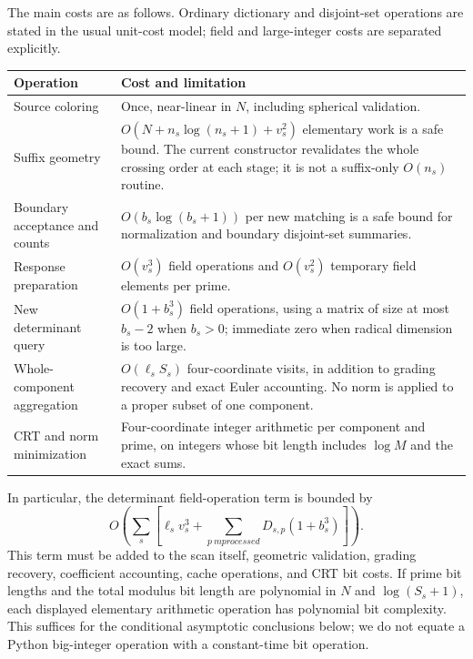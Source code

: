 The main costs are as follows. Ordinary dictionary and disjoint-set operations
are stated in the usual unit-cost model; field and large-integer costs are
separated explicitly.

\begin{center}
\begin{tabularx}{\textwidth}{@{}P{0.29\textwidth}X@{}}
\toprule
Operation & Cost and limitation\\
\midrule
Source coloring & Once, near-linear in $N$, including spherical validation.\\
Suffix geometry & $O(N+n_s\log(n_s+1)+v_s^2)$ elementary work is a safe bound.
The current constructor revalidates the whole crossing order at each stage;
it is not a suffix-only $O(n_s)$ routine.\\
Boundary acceptance and counts & $O(b_s\log(b_s+1))$ per new matching is a safe
bound for normalization and boundary disjoint-set summaries.\\
Response preparation & $O(v_s^3)$ field operations and $O(v_s^2)$ temporary
field elements per prime.\\
New determinant query & $O(1+b_s^3)$ field operations, using a matrix of size
at most $b_s-2$ when $b_s>0$; immediate zero when radical dimension is too large.\\
Whole-component aggregation & $O(\ell_sS_s)$ four-coordinate visits, in addition
to grading recovery and exact Euler accounting. No norm is applied to a proper
subset of one component.\\
CRT and norm minimization & Four-coordinate integer arithmetic per component
and prime, on integers whose bit length includes $\log M$ and the exact sums.\\
\bottomrule
\end{tabularx}
\end{center}

In particular, the determinant field-operation term is bounded by
\begin{equation}
 O\!\left(\sum_s\left[
       \ell_s v_s^3+\sum_{p\ {
m processed}}D_{s,p}(1+b_s^3)
                      \right]\right).
 \label{eq:arithmetic-ledger}
\end{equation}
This term must be added to the scan itself, geometric validation, grading
recovery, coefficient accounting, cache operations, and CRT bit costs.
If prime bit lengths and the total modulus bit length are polynomial in $N$
and $\log(S_s+1)$, each displayed elementary arithmetic operation has polynomial
bit complexity. This suffices for the conditional asymptotic conclusions below;
we do not equate a Python big-integer operation with a constant-time bit operation.


